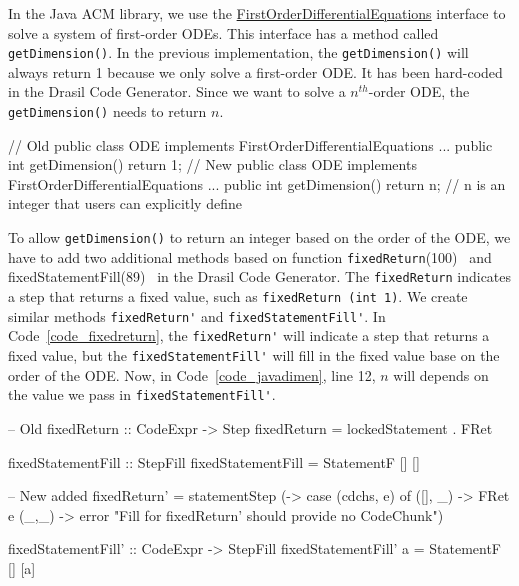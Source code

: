 In the Java ACM library, we use the \href{https://commons.apache.org/proper/commons-math/apidocs/org/apache/commons/math4/ode/FirstOrderDifferentialEquations.html}{FirstOrderDifferentialEquations} interface to solve a system of first-order ODEs. This interface has a method called \verb|getDimension()|. In the previous implementation, the \verb|getDimension()| will always return 1 because we only solve a first-order ODE. It has been hard-coded in the Drasil Code Generator. Since we want to solve a $n^{th}$-order ODE, the \verb|getDimension()| needs to return $n$.

\begin{listing}
\begin{java1}
// Old 
public class ODE implements FirstOrderDifferentialEquations {
  ...
  public int getDimension() {
    return 1;
  }
}
// New 
public class ODE implements FirstOrderDifferentialEquations {
  ...
  public int getDimension() {
    return n; // n is an integer that users can explicitly define
  }
}
\end{java1}
\label{code_javadimen}
\end{listing}

To allow \verb|getDimension()| to return an integer based on the order of the ODE, we have to add two additional methods based on function \verb|fixedReturn|(100)~\citep{brooks} and fixedStatementFill(89)~\citep{brooks} in the Drasil Code Generator. The \verb|fixedReturn| indicates a step that returns a fixed value, such as \verb|fixedReturn (int 1)|. We create similar methods \verb|fixedReturn'| and \verb|fixedStatementFill'|. In Code~\ref{code_fixedreturn}, the \verb|fixedReturn'| will indicate a step that returns a fixed value, but the \verb|fixedStatementFill'| will fill in the fixed value base on the order of the ODE. Now, in Code~\ref{code_javadimen}, line 12, $n$ will depends on the value we pass in \verb|fixedStatementFill'|.

\begin{listing}
\begin{haskell1}
-- Old 
fixedReturn :: CodeExpr -> Step
fixedReturn = lockedStatement . FRet

fixedStatementFill :: StepFill
fixedStatementFill = StatementF [] []

-- New added 
fixedReturn' = statementStep (\cdchs [e] -> case (cdchs, e) of
  ([], _) -> FRet e
  (_,_) -> error "Fill for fixedReturn' should provide no CodeChunk")

fixedStatementFill' :: CodeExpr -> StepFill
fixedStatementFill' a = StatementF [] [a]
\end{haskell1}
\label{code_fixedreturn}
\end{listing}

